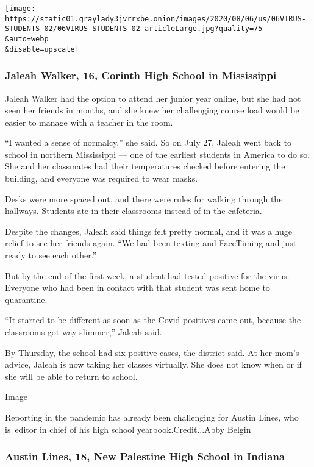 \texttt{[image: https://static01.graylady3jvrrxbe.onion/images/2020/08/06/us/06VIRUS-STUDENTS-02/06VIRUS-STUDENTS-02-articleLarge.jpg?quality=75\\\&auto=webp\\\&disable=upscale]}

\hypertarget{jaleah-walker-16-corinth-high-school-in-mississippi}{%
\subsubsection{Jaleah Walker, 16, Corinth High School in
Mississippi}\label{jaleah-walker-16-corinth-high-school-in-mississippi}}

Jaleah Walker had the option to attend her junior year online, but she
had not seen her friends in months, and she knew her challenging course
load would be easier to manage with a teacher in the room.

``I wanted a sense of normalcy,'' she said. So on July 27, Jaleah went
back to school in northern Mississippi --- one of the earliest students
in America to do so. She and her classmates had their temperatures
checked before entering the building, and everyone was required to wear
masks.

Desks were more spaced out, and there were rules for walking through the
hallways. Students ate in their classrooms instead of in the cafeteria.

Despite the changes, Jaleah said things felt pretty normal, and it was a
huge relief to see her friends again. ``We had been texting and
FaceTiming and just ready to see each other.''

But by the end of the first week, a student had tested positive for the
virus. Everyone who had been in contact with that student was sent home
to quarantine.

``It started to be different as soon as the Covid positives came out,
because the classrooms got way slimmer,'' Jaleah said.

By Thursday, the school had six positive cases, the district said. At
her mom's advice, Jaleah is now taking her classes virtually. She does
not know when or if she will be able to return to school.

Image

Reporting in the pandemic has already been challenging for Austin Lines,
who is~editor in chief of his high school yearbook.Credit...Abby Belgin

\hypertarget{austin-lines-18-new-palestine-high-school-in-indiana}{%
\subsubsection{Austin Lines, 18, New Palestine High School in
Indiana}\label{austin-lines-18-new-palestine-high-school-in-indiana}}

